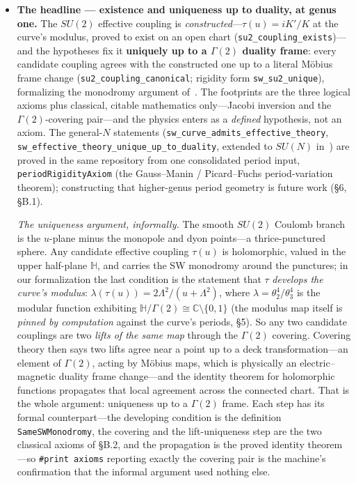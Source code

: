 \documentclass{article}
\theoremstyle{plain}
\theoremstyle{definition}
\numberwithin{equation}{section}
\newcommand{\C}{\mathbb{C}}
\newcommand{\HH}{\mathbb{H}}
\newcommand{\code}[1]{\texttt{#1}}
\begin{document}
\begin{itemize}
\item \textbf{The headline --- existence and uniqueness up to duality, at genus one.} The
$SU(2)$ effective coupling is \emph{constructed}---$\tau(u) = iK'/K$ at the curve's modulus,
proved to exist on an open chart (\code{su2\_coupling\_exists})---and the hypotheses fix it
\textbf{uniquely up to a $\Gamma(2)$ duality frame}: every candidate coupling agrees with the
constructed one up to a literal M\"obius frame change
(\code{su2\_coupling\_canonical}; rigidity form \code{sw\_su2\_unique}), formalizing the
monodromy argument of~\cite{SeibergWitten1994a}. The footprints are the three logical axioms
plus classical, citable mathematics only---Jacobi inversion and the $\Gamma(2)$-covering
pair---and the physics enters as a \emph{defined} hypothesis, not an axiom. The general-$N$
statements (\code{sw\_curve\_admits\_\allowbreak effective\_theory},
\code{sw\_effective\_theory\_\allowbreak unique\_up\_to\_duality}, extended to $SU(N)$
in~\cite{KLYT1995,ArgyresFaraggi1995}) are proved in the same repository from one consolidated
period input, \code{periodRigidityAxiom} (the Gauss--Manin / Picard--Fuchs period-variation
theorem); constructing that higher-genus period geometry is future work (\S6, \S B.1).

\emph{The uniqueness argument, informally.} The smooth $SU(2)$ Coulomb branch is the $u$-plane
minus the monopole and dyon points---a thrice-punctured sphere. Any candidate effective
coupling $\tau(u)$ is holomorphic, valued in the upper half-plane $\HH$, and carries the SW
monodromy around the punctures; in our formalization the last condition is the statement that
$\tau$ \emph{develops the curve's modulus}: $\lambda(\tau(u)) = 2\Lambda^2/(u+\Lambda^2)$,
where $\lambda = \theta_2^4/\theta_3^4$ is the modular function exhibiting
$\HH/\Gamma(2) \cong \C\setminus\{0,1\}$ (the modulus map itself is \emph{pinned by
computation} against the curve's periods, \S5). So any two candidate couplings are two
\emph{lifts of the same map} through the $\Gamma(2)$ covering. Covering theory then says two
lifts agree near a point up to a deck transformation---an element of $\Gamma(2)$, acting by
M\"obius maps, which is physically an electric--magnetic duality frame change---and the
identity theorem for holomorphic functions propagates that local agreement across the connected
chart. That is the whole argument: uniqueness up to a $\Gamma(2)$ frame. Each step has its
formal counterpart---the developing condition is the definition \code{SameSWMonodromy}, the
covering and the lift-uniqueness step are the two classical axioms of \S B.2, and the
propagation is the proved identity theorem---so \code{\#print axioms} reporting exactly the
covering pair is the machine's confirmation that the informal argument used nothing else.


\end{itemize}
\end{document}
